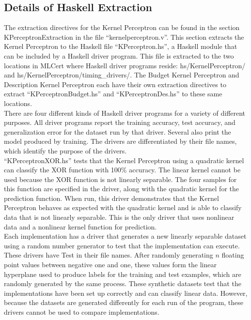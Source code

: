 \subsection{Details of Haskell Extraction}\label{DetailsHaskellExtraction}
The extraction directives for the Kernel Perceptron can be found in the section KPerceptronExtraction in the file ``kernelperceptron.v''. This section extracts the Kernel Perceptron to the Haskell file ``KPerceptron.hs'', a Haskell module that can be included by a Haskell driver program. This file is extracted to the two locations in MLCert where Haskell driver programs reside: hs/KernelPerceptron/ and hs/KernelPerceptron/timing\_drivers/. The Budget Kernel Perceptron and Description Kernel Perceptron each have their own extraction directives to extract ``KPerceptronBudget.hs'' and ``KPerceptronDes.hs'' to these same locations. 
\\There are four different kinds of Haskell driver programs for a variety of different purposes. All driver programs report the training accuracy, test accuracy, and generalization error for the dataset run by that driver. Several also print the model produced by training. The drivers are differentiated by their file names, which identify the purpose of the drivers.
\\``KPerceptronXOR.hs'' tests that the Kernel Perceptron using a quadratic kernel can classify the XOR function with 100\% accuracy. The linear kernel cannot be used because the XOR function is not linearly separable. The four samples for this function are specified in the driver, along with the quadratic kernel for the prediction function. When run, this driver demonstrates that the Kernel Perceptron behaves as expected with the quadratic kernel and is able to classify data that is not linearly separable. This is the only driver that uses nonlinear data and a nonlinear kernel function for prediction.
\\Each implementation has a driver that generates a new linearly separable dataset using a random number generator to test that the implementation can execute. These drivers have Test in their file names. After randomly generating $n$ floating point values between negative one and one, these values form the linear hyperplane used to produce labels for the training and test examples, which are randomly generated by the same process. These synthetic datasets test that the implementations have been set up correctly and can classify linear data. However, because the datasets are generated differently for each run of the program, these drivers cannot be used to compare implementations.
